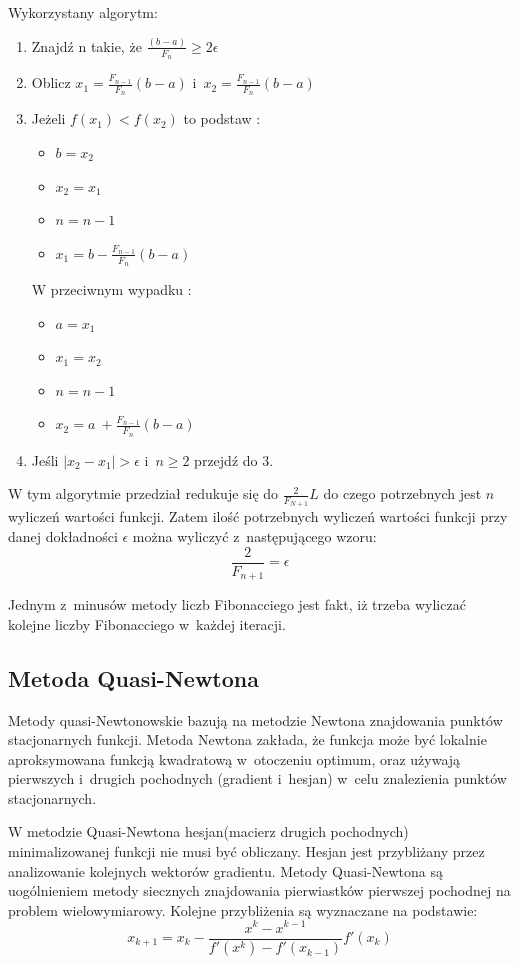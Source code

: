 \documentclass{classrep}
\begin{document}
\noindent Wykorzystany algorytm:
\begin{enumerate}
\item Znajdź n takie, że $\frac{(b-a)}{F_n}\geq 2\epsilon$
\item Oblicz $x_1 = \frac{F_{n-1}}{F_n}(b-a)$ i~$x_2 = \frac{F_{n-1}}{F_n}(b-a)$
\item Jeżeli $f(x_1)<f(x_2)$ to podstaw :
	\begin{itemize}
	\item $b=x_2$
	\item $x_2=x_1$
	\item $n=n-1$
	\item $x_1 = b - \frac{F_{n-1}}{F_n}(b-a)$
	\end{itemize}
	W przeciwnym wypadku :
	\begin{itemize}
	\item $a=x_1$
	\item $x_1=x_2$
	\item $n=n-1$
	\item $x_2 = a~+ \frac{F_{n-1}}{F_n}(b-a)$
	\end{itemize}	
	\item Jeśli $|x_2-x_1|>\epsilon$ i~$n \geq 2$ przejdź do 3.
\end{enumerate}

W tym algorytmie przedział redukuje się do $\frac{2}{F_{N+1}} L$ do czego potrzebnych jest $n$ wyliczeń wartości funkcji. Zatem ilość potrzebnych wyliczeń wartości funkcji przy danej dokładności $\epsilon$ można wyliczyć z~następującego wzoru:
\begin{equation}
\frac{2}{F_{n+1}} = \epsilon
\end{equation}

Jednym z~minusów metody liczb Fibonacciego jest fakt, iż trzeba wyliczać kolejne liczby Fibonacciego w~każdej iteracji.

\subsection{Metoda Quasi-Newtona}
Metody quasi-Newtonowskie bazują na metodzie Newtona znajdowania punktów stacjonarnych funkcji. Metoda Newtona zakłada, że funkcja może być lokalnie aproksymowana funkcją kwadratową w~otoczeniu optimum, oraz używają pierwszych i~drugich pochodnych (gradient i~hesjan) w~celu znalezienia punktów stacjonarnych.

W metodzie Quasi-Newtona hesjan(macierz drugich pochodnych) minimalizowanej funkcji nie musi być obliczany. Hesjan jest przybliżany przez analizowanie kolejnych wektorów gradientu. Metody Quasi-Newtona są uogólnieniem metody siecznych znajdowania pierwiastków pierwszej pochodnej na problem wielowymiarowy. Kolejne przybliżenia są wyznaczane na podstawie:
\begin{equation}
x_{k+1} = x_k - \frac{x^k-x^{k-1}}{f'(x^k)-f'(x_{k-1})} f'(x_k)
\end{equation}
\end{document}
